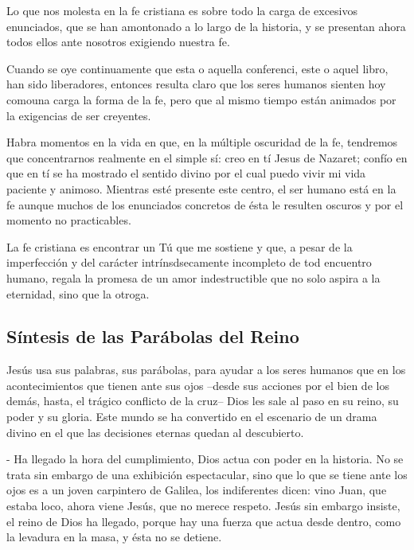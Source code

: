 \documentclass[10pt]{article}
\begin{document}
    Lo que nos molesta en la fe cristiana es sobre todo la carga de excesivos
    enunciados, que se han amontonado a lo largo de la historia, y se
    presentan ahora todos ellos ante nosotros exigiendo nuestra fe.

    Cuando se oye continuamente que esta o aquella conferenci, este o aquel
    libro, han sido liberadores, entonces resulta claro que los seres humanos
    sienten hoy comouna carga la forma de la fe, pero que al mismo tiempo
    están animados por la exigencias de ser creyentes.

    Habra momentos en la vida en que, en la múltiple oscuridad de la fe,
    tendremos que concentrarnos realmente en el simple sí: creo en tí Jesus de
    Nazaret; confío en que en tí se ha mostrado el sentido divino por el cual
    puedo vivir mi vida paciente y animoso. Mientras esté presente este
    centro, el ser humano está en la fe aunque muchos de los enunciados
    concretos de ésta le resulten oscuros y por el momento no practicables.

    La fe cristiana es encontrar un Tú que me sostiene y que, a pesar de la
    imperfección y del carácter intrínsdsecamente incompleto de tod encuentro
    humano, regala la promesa de un amor indestructible que no solo aspira a
    la eternidad, sino que la otroga.

\subsection{Síntesis de las Parábolas del Reino}

    Jesús usa sus palabras, sus parábolas, para ayudar a los seres humanos que en
    los acontecimientos que tienen ante sus ojos --desde sus acciones por el bien
    de los demás, hasta, el trágico conflicto de la cruz-- Dios les sale al paso
    en su reino, su poder y su gloria. Este mundo se ha convertido en el escenario
    de un drama divino en el que las decisiones eternas quedan al descubierto.

    - Ha llegado la hora del cumplimiento, Dios actua con poder en la historia. No
    se trata sin embargo de una exhibición espectacular, sino que lo que se tiene
    ante los ojos es a un joven carpintero de Galilea, los indiferentes dicen:
    vino Juan, que estaba loco, ahora viene Jesús, que no merece respeto. Jesús
    sin embargo insiste, el reino de Dios ha llegado, porque hay una fuerza que
    actua desde dentro, como la levadura en la masa, y ésta no se detiene.
\end{document}
